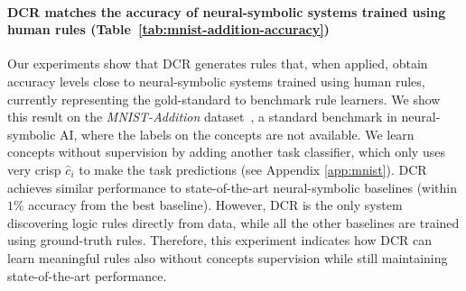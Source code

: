 \paragraph{DCR matches the accuracy of neural-symbolic systems trained using human rules (Table~\ref{tab:mnist-addition-accuracy})}
Our experiments show that DCR generates rules that, when applied, obtain accuracy levels close to neural-symbolic systems trained using human rules, currently representing the gold-standard to benchmark rule learners.
We show this result on the \emph{MNIST-Addition} dataset~\cite{manhaeve2018deepproblog}, a standard benchmark in neural-symbolic AI, where the labels on the concepts are not available. We learn concepts without supervision by adding another task classifier, which only uses very crisp $\hat{c}_i$ to make the task predictions (see Appendix \ref{app:mnist}). 
DCR achieves similar performance to state-of-the-art neural-symbolic baselines (within $1\%$ accuracy from the best baseline). However, DCR is the only system discovering logic rules directly from data, while all the other baselines are trained using ground-truth rules. Therefore, this experiment indicates how DCR can learn meaningful rules also without concepts supervision while still maintaining state-of-the-art performance.
\begin{table}[]
\centering
\caption{Task accuracy on the \emph{MNIST-addition} dataset. The neural-symbolic baselines use the knowledge of the symbolic task %
to distantly supervise the image recognition task. DCR achieves similar performances even though it learns the rules from scratch.}
\label{tab:mnist-addition-accuracy}
\end{table}
